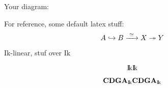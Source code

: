 \documentclass[a4paper, 12pt]{amsart}
\begin{document}
Your diagram:

For reference, some default latex stuff:
$$ A \hookrightarrow B \xrightarrow{\,\,{\simeq}\,\,} X \twoheadrightarrow Y $$

\newcommand{\newk}{\mathrm{I\!k}}

$\newk$-linear, stuf over $\newk$

\[ \k \newk \]

\[ \CDGA_\k \CDGA_\newk \]
\end{document}
